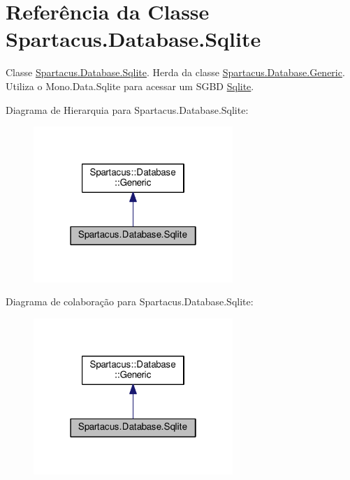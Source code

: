 \hypertarget{classSpartacus_1_1Database_1_1Sqlite}{\section{Referência da Classe Spartacus.\+Database.\+Sqlite}
\label{classSpartacus_1_1Database_1_1Sqlite}
}


Classe \hyperlink{classSpartacus_1_1Database_1_1Sqlite}{Spartacus.\+Database.\+Sqlite}. Herda da classe \hyperlink{classSpartacus_1_1Database_1_1Generic}{Spartacus.\+Database.\+Generic}. Utiliza o Mono.\+Data.\+Sqlite para acessar um S\+G\+B\+D \hyperlink{classSpartacus_1_1Database_1_1Sqlite}{Sqlite}.  




Diagrama de Hierarquia para Spartacus.\+Database.\+Sqlite\+:
\nopagebreak
\begin{figure}[H]
\begin{center}
\leavevmode
\includegraphics[width=214pt]{classSpartacus_1_1Database_1_1Sqlite__inherit__graph}
\end{center}
\end{figure}


Diagrama de colaboração para Spartacus.\+Database.\+Sqlite\+:
\nopagebreak
\begin{figure}[H]
\begin{center}
\leavevmode
\includegraphics[width=214pt]{classSpartacus_1_1Database_1_1Sqlite__coll__graph}
\end{center}
\end{figure}
